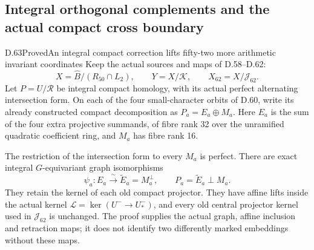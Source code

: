 \subsection{Integral orthogonal complements and the actual compact cross boundary}

\begin{statement}{D.63}{Proved}{An integral compact correction lifts fifty-two more arithmetic invariant coordinates}
Keep the actual sources and maps of D.58--D.62:
\[
 X=\widehat B/(R_{50}\cap L_2),\qquad
 Y=X/\mathcal K,\qquad X_{62}=X/\mathcal J_{62}.
 \tag{D.63.1}
\]
Let \(P=U/\mathcal R\) be integral compact homology,
with its actual perfect alternating intersection form.
On each of the four small-character orbits of D.60,
write its already constructed compact decomposition
as \(P_a=E_a\oplus M_a\). Here \(E_a\) is the sum
of the four extra projective summands, of fibre rank
32 over the unramified quadratic coefficient ring,
and \(M_a\) has fibre rank 16.

The restriction of the intersection form to every
\(M_a\) is perfect. There are exact integral
\(G\)-equivariant graph isomorphisms
\[
 \psi_a:E_a\xrightarrow{\ \sim\ }\widetilde E_a=M_a^\perp,
 \qquad P_a=\widetilde E_a\mathbin{\perp}M_a.
 \tag{D.63.2}
\]
They retain the kernel of each old compact projector.
They have affine lifts inside the actual kernel
\(\mathcal L=\ker(U^-\to U_*^-)\), and every old
central projector kernel used in \(\mathcal J_{62}\)
is unchanged. The proof supplies the actual graph,
affine inclusion and retraction maps; it does not
identify two differently marked embeddings without
these maps.


\end{statement}
